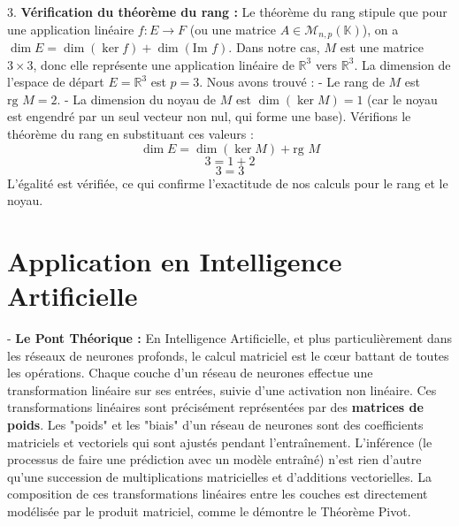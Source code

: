 \documentclass[12pt,a4paper]{report}
\begin{document}
    3.  \textbf{Vérification du théorème du rang :}
        Le théorème du rang stipule que pour une application linéaire $f: E \to F$ (ou une matrice $A \in \mathcal{M}_{n,p}(\mathbb{K})$), on a $\dim E = \dim(\ker f) + \dim(\text{Im } f)$.
        Dans notre cas, $M$ est une matrice $3 \times 3$, donc elle représente une application linéaire de $\mathbb{R}^3$ vers $\mathbb{R}^3$. La dimension de l'espace de départ $E = \mathbb{R}^3$ est $p=3$.
        Nous avons trouvé :
        -   Le rang de $M$ est $\text{rg } M = 2$.
        -   La dimension du noyau de $M$ est $\dim(\ker M) = 1$ (car le noyau est engendré par un seul vecteur non nul, qui forme une base).
        Vérifions le théorème du rang en substituant ces valeurs :
        $$\dim E = \dim(\ker M) + \text{rg } M$$
        $$3 = 1 + 2$$
        $$3 = 3$$
        L'égalité est vérifiée, ce qui confirme l'exactitude de nos calculs pour le rang et le noyau.

\section{Application en Intelligence Artificielle}

-   \textbf{Le Pont Théorique :} En Intelligence Artificielle, et plus particulièrement dans les réseaux de neurones profonds, le calcul matriciel est le cœur battant de toutes les opérations. Chaque couche d'un réseau de neurones effectue une transformation linéaire sur ses entrées, suivie d'une activation non linéaire. Ces transformations linéaires sont précisément représentées par des \textbf{matrices de poids}. Les "poids" et les "biais" d'un réseau de neurones sont des coefficients matriciels et vectoriels qui sont ajustés pendant l'entraînement. L'inférence (le processus de faire une prédiction avec un modèle entraîné) n'est rien d'autre qu'une succession de multiplications matricielles et d'additions vectorielles. La composition de ces transformations linéaires entre les couches est directement modélisée par le produit matriciel, comme le démontre le Théorème Pivot.
\end{document}
